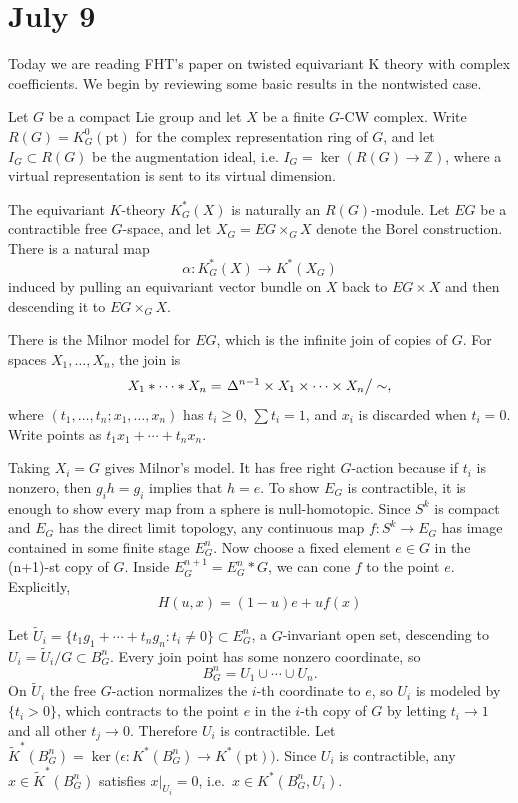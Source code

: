 \documentclass[12pt]{article}
\begin{document}
\section{July 9}
Today we are reading FHT's paper on twisted equivariant K theory with complex coefficients. We begin by reviewing some basic results in the nontwisted case.

Let $G$ be a compact Lie group and let $X$ be a finite $G$-CW complex. Write
$R(G)=K_G^0(\mathrm{pt})$ for the complex representation ring of $G$, and let
$I_G \subset R(G)$ be the augmentation ideal, i.e.
$I_G=\ker(R(G)\to \mathbb Z)$, where a virtual representation is sent to its
virtual dimension.

The equivariant $K$-theory $K_G^*(X)$ is naturally an $R(G)$-module. Let
$EG$ be a contractible free $G$-space, and let
$X_G=EG\times_G X$ denote the Borel construction. There is a natural map
\[\alpha:K_G^*(X)\to K^*(X_G)\] induced by pulling an equivariant vector bundle
on $X$ back to $EG\times X$ and then descending it to $EG\times_G X$.

There is the Milnor model for $EG$, which is the infinite join of copies of $G$. For spaces $X_1,\dots,X_n$, the join is
\[
X_1 * \cdots * X_n
= \left.\Delta^{n-1}\times X_1\times\cdots\times X_n \right/ \sim,
\]
where $(t_1,\dots,t_n;x_1,\dots,x_n)$ has $t_i\ge 0$, $\sum t_i=1$, and $x_i$ is discarded when $t_i=0$. Write points as $t_1x_1+\cdots+t_nx_n$.

Taking $X_i=G$ gives Milnor's model. It has free right $G$-action because if $t_i$ is nonzero, then $g_ih = g_i$ implies that $h=e$. To show $E_G$ is contractible, it is enough to show every map from a sphere is null-homotopic. Since $S^k$ is compact and $E_G$ has the direct limit topology, any continuous map $f:S^k\to E_G$ has image contained in some finite stage $E_G^n$. Now choose a fixed element $e\in G$ in the (n+1)-st copy of $G$. Inside $E_G^{n+1}=E_G^n * G$, we can cone $f$ to the point $e$. Explicitly,
\[H(u,x)=(1-u)e+u f(x)\]

Let $\widetilde U_i = \{t_1g_1+\cdots+t_ng_n : t_i\neq 0\} \subset E_G^n$, a $G$-invariant open set, descending to $U_i = \widetilde U_i/G \subset B_G^n$. Every join point has some nonzero coordinate, so
\[
B_G^n = U_1\cup\cdots\cup U_n.
\]
On $\widetilde U_i$ the free $G$-action normalizes the $i$-th coordinate to $e$, so $U_i$ is modeled by $\{t_i>0\}$, which contracts to the point $e$ in the $i$-th copy of $G$ by letting $t_i\to 1$ and all other $t_j\to 0$. Therefore $U_i$ is contractible. Let $\widetilde K^*(B_G^n)=\ker\big(\epsilon: K^*(B_G^n)\to K^*(\mathrm{pt})\big)$. Since $U_i$ is contractible, any $x\in\widetilde K^*(B_G^n)$ satisfies $x|_{U_i}=0$, i.e.\ $x\in K^*(B_G^n,U_i)$.
\end{document}
